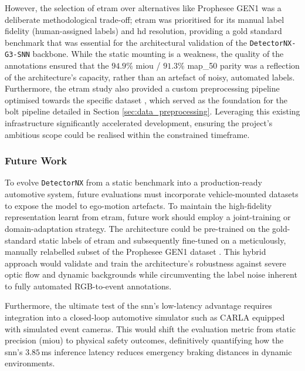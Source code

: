 However, the selection of \gls{etram} over alternatives like Prophesee GEN1 was a deliberate methodological trade-off; \gls{etram} was prioritised for its manual label fidelity (human-assigned labels) and \gls{hd} resolution, providing a gold standard benchmark that was essential for the architectural validation of the \texttt{DetectorNX-G3-SNN} backbone.
While the static mounting is a weakness, the quality of the annotations ensured that the $94.9\%$ \gls{miou} / $91.3\%$ \gls{map_50} parity was a reflection of the architecture's capacity, rather than an artefact of noisy, automated labels.
Furthermore, the \gls{etram} study also provided a custom preprocessing pipeline optimised towards the specific dataset \cite{Verma_2024_CVPR}, which served as the foundation for the \gls{bolt} pipeline detailed in Section \ref{sec:data_preprocessing}. Leveraging this existing infrastructure significantly accelerated development, ensuring the project's ambitious scope could be realised within the constrained timeframe.

\subsubsection*{Future Work}
To evolve \texttt{DetectorNX} from a static benchmark into a production-ready automotive system, future evaluations must incorporate vehicle-mounted datasets to expose the model to ego-motion artefacts. To maintain the high-fidelity representation learnt from \gls{etram}, future work should employ a joint-training or domain-adaptation strategy. The architecture could be pre-trained on the gold-standard static labels of \gls{etram} and subsequently fine-tuned on a meticulously, manually relabelled subset of the Prophesee GEN1 dataset \cite{prophesse_gen1}. This hybrid approach would validate and train the architecture's robustness against severe optic flow and dynamic backgrounds while circumventing the label noise inherent to fully automated RGB-to-event annotations.

Furthermore, the ultimate test of the \gls{snn}'s low-latency advantage requires integration into a closed-loop automotive simulator such as CARLA \cite{carla_sim} equipped with simulated event cameras. This would shift the evaluation metric from static precision (\gls{miou}) to physical safety outcomes, definitively quantifying how the \gls{snn}'s $3.85$\,ms inference latency reduces emergency braking distances in dynamic environments.
